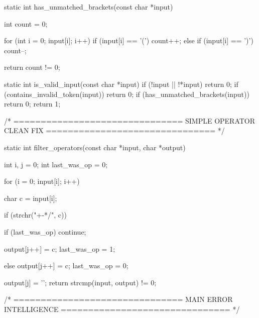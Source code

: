 \documentclass{article}
\begin{document}
static int has_unmatched_brackets(const char *input)
{
    int count = 0;

    for (int i = 0; input[i]; i++)
    {
        if (input[i] == '(') count++;
        else if (input[i] == ')') count--;
    }

    return count != 0;
}

static int is_valid_input(const char *input)
{
    if (!input || !*input) return 0;
    if (contains_invalid_token(input)) return 0;
    if (has_unmatched_brackets(input)) return 0;
    return 1;
}

/* ===============================
   SIMPLE OPERATOR CLEAN FIX
   =============================== */

static int filter_operators(const char *input, char *output)
{
    int i, j = 0;
    int last_was_op = 0;

    for (i = 0; input[i]; i++)
    {
        char c = input[i];

        if (strchr("+-*/", c))
        {
            if (last_was_op) continue;

            output[j++] = c;
            last_was_op = 1;
        }
        else
        {
            output[j++] = c;
            last_was_op = 0;
        }
    }

    output[j] = '\0';
    return strcmp(input, output) != 0;
}

/* ===============================
   MAIN ERROR INTELLIGENCE
   =============================== */
\end{document}
